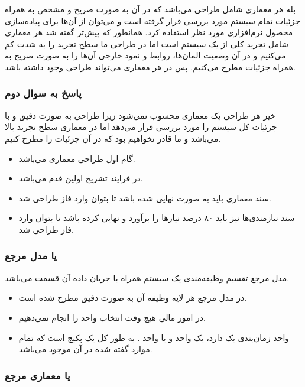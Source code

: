 بله هر معماری شامل طراحی می‌باشد که در آن به صورت صریح و مشخص به همراه جزئیات
تمام سیستم مورد بررسی قرار گرفته است و می‌توان از آن‌ها برای پیاده‌سازی محصول
نرم‌افزاری مورد نظر استفاده کرد. همانطور که پیش‌تر گفته شد هر معماری شامل تجرید
کلی از یک سیستم است اما در طراحی ما سطح تجرید را به شدت کم می‌کنیم و در آن وضعیت
المان‌ها، روابط و نمود خارجی آن‌ها را به صورت صریح به همراه جزئیات مطرح می‌کنیم.
پس در هر معماری می‌تواند طراحی وجود داشته باشد.

\subsubsection*{پاسخ به سوال دوم}

خیر هر طراحی یک معماری محسوب نمی‌شود زیرا طراحی به صورت دقیق و با جزئیات کل
سیستم را مورد بررسی قرار می‌دهد اما در معماری سطح تجرید بالا می‌باشد و ما قادر
نخواهیم بود که در آن جزئیات را مطرح کنیم.

\begin{itemize}
    \item گام اول طراحی معماری می‌باشد.
    \item در  فرایند تشریح اولین قدم می‌باشد.
    \item سند معماری باید به صورت نهایی شده باشد تا بتوان وارد فاز طراحی شد.
    \item سند نیازمندی‌ها نیز باید ۸۰ درصد نیاز‌ها را برآورد و نهایی کرده باشد
    تا بتوان وارد فاز طراحی شد.
\end{itemize}

\subsubsection{ یا مدل مرجع}

مدل مرجع تقسیم وظیفه‌مندی یک سیستم همراه با جریان داده آن قسمت می‌باشد.

\begin{itemize}
    \item در مدل مرجع  هر لایه وظیفه آن به صورت دقیق مطرح شده است.
    \item در امور مالی هیچ وقت انتخاب واحد را انجام نمی‌دهیم.
    \item واحد زمان‌بندی یک  دارد، یک واحد  و یا واحد
    . به طور کل یک پکیج است که تمام موارد گفته شده در آن موجود
    می‌باشد.
\end{itemize}

\subsubsection{ یا معماری مرجع}

